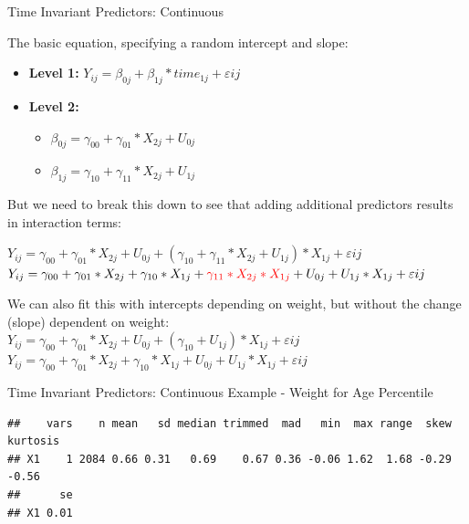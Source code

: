 \documentclass[ignorenonframetext,]{beamer}
\newenvironment{Shaded}{\begin{snugshade}}{\end{snugshade}}
\newcommand{\KeywordTok}[1]{\textcolor[rgb]{0.13,0.29,0.53}{\textbf{{#1}}}}
\newcommand{\NormalTok}[1]{{#1}}
\begin{document}
\begin{frame}{Time Invariant Predictors: Continuous}

The basic equation, specifying a random intercept and slope:\\

\begin{itemize}
  \item \textbf{Level 1:} $Y_{ij} = \beta_{0j} + \beta_{1j}*time_{1j} + \varepsilon{ij}$
  \item \textbf{Level 2:} 
    \begin{itemize} 
      \item $\beta_{0j} = \gamma_{00} + \gamma_{01}*X_{2j} + U_{0j}$
      \item $\beta_{1j} = \gamma_{10} + \gamma_{11}*X_{2j} + U_{1j}$
    \end{itemize}
\end{itemize}

But we need to break this down to see that adding additional predictors
results in interaction terms:

\(Y_{ij} = \gamma_{00} + \gamma_{01}*X_{2j} + U_{0j} + (\gamma_{10} + \gamma_{11}*X_{2j} + U_{1j})*X_{1j} + \varepsilon{ij}\)
\(Y_{ij} = \gamma_{00} + \gamma_{01}*X_{2j} + \gamma_{10}*X_{1j} + \textcolor{red}{\gamma_{11}*X_{2j}*X_{1j}} + U_{0j} + U_{1j}*X_{1j} + \varepsilon{ij}\)

We can also fit this with intercepts depending on weight, but without
the change (slope) dependent on weight:\\
\(Y_{ij} = \gamma_{00} + \gamma_{01}*X_{2j} + U_{0j} + (\gamma_{10} + U_{1j})*X_{1j} + \varepsilon{ij}\)
\(Y_{ij} = \gamma_{00} + \gamma_{01}*X_{2j} + \gamma_{10}*X_{1j} + U_{0j} + U_{1j}*X_{1j} + \varepsilon{ij}\)

\end{frame}

\begin{frame}[fragile]{Time Invariant Predictors: Continuous Example -
Weight for Age Percentile}

\begin{Shaded}
\end{Shaded}

\footnotesize

\begin{verbatim}
##    vars    n mean   sd median trimmed  mad   min  max range  skew kurtosis
## X1    1 2084 0.66 0.31   0.69    0.67 0.36 -0.06 1.62  1.68 -0.29    -0.56
##      se
## X1 0.01
\end{verbatim}

\normalsize

\end{frame}
\end{document}
